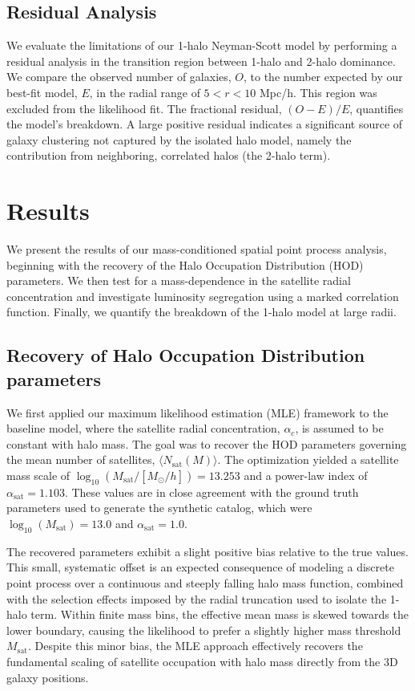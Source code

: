 \documentclass[]{article}
\begin{document}
\subsection{Residual Analysis}
We evaluate the limitations of our 1-halo Neyman-Scott model by performing a residual analysis in the transition region between 1-halo and 2-halo dominance. We compare the observed number of galaxies, $O$, to the number expected by our best-fit model, $E$, in the radial range of $5 < r < 10$ Mpc/h. This region was excluded from the likelihood fit. The fractional residual, $(O-E)/E$, quantifies the model's breakdown. A large positive residual indicates a significant source of galaxy clustering not captured by the isolated halo model, namely the contribution from neighboring, correlated halos (the 2-halo term).

\section{Results}
\label{sec:results}
We present the results of our mass-conditioned spatial point process analysis, beginning with the recovery of the Halo Occupation Distribution (HOD) parameters. We then test for a mass-dependence in the satellite radial concentration and investigate luminosity segregation using a marked correlation function. Finally, we quantify the breakdown of the 1-halo model at large radii.

\subsection{Recovery of Halo Occupation Distribution parameters}
We first applied our maximum likelihood estimation (MLE) framework to the baseline model, where the satellite radial concentration, $\alpha_c$, is assumed to be constant with halo mass. The goal was to recover the HOD parameters governing the mean number of satellites, $\langle N_{\text{sat}}(M) \rangle$. The optimization yielded a satellite mass scale of $\log_{10}(M_{\text{sat}}/[M_\odot/h]) = 13.253$ and a power-law index of $\alpha_{\text{sat}} = 1.103$. These values are in close agreement with the ground truth parameters used to generate the synthetic catalog, which were $\log_{10}(M_{\text{sat}}) = 13.0$ and $\alpha_{\text{sat}} = 1.0$.

The recovered parameters exhibit a slight positive bias relative to the true values. This small, systematic offset is an expected consequence of modeling a discrete point process over a continuous and steeply falling halo mass function, combined with the selection effects imposed by the radial truncation used to isolate the 1-halo term. Within finite mass bins, the effective mean mass is skewed towards the lower boundary, causing the likelihood to prefer a slightly higher mass threshold $M_{\text{sat}}$. Despite this minor bias, the MLE approach effectively recovers the fundamental scaling of satellite occupation with halo mass directly from the 3D galaxy positions.
\end{document}
